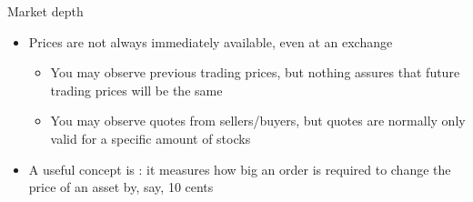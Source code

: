 \begin{frame}{Market depth}
\begin{itemize}
	\item Prices are not always immediately available, even at an exchange
	\begin{itemize}
		\item You may observe previous trading prices, but nothing assures that future trading prices will be the same
		\item You may observe quotes from sellers/buyers, but quotes are normally only valid for a specific amount of stocks
	\end{itemize}
	\item A useful concept is : it measures how big an order is required to change the price of an asset by, say, 10 cents
\end{itemize}
\end{frame}



